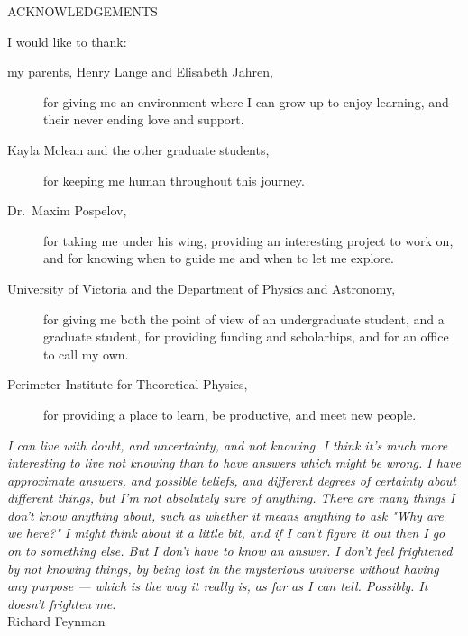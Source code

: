 \newpage
{}

\begin{center}
ACKNOWLEDGEMENTS
\end{center}

\noindent I would like to thank:
\begin{description}
\item[my parents, Henry Lange and Elisabeth Jahren,]
    for giving me an environment where I can grow up to enjoy learning, and their never ending love and support.
\item[Kayla Mclean and the other graduate students,]
    for keeping me human throughout this journey.
\item[Dr.~Maxim Pospelov,]
    for taking me under his wing, providing an interesting project to work on, and for knowing when to guide me and when to let me explore.
\item[University of Victoria and the Department of Physics and Astronomy,]
    for giving me both the point of view of an undergraduate student, and a graduate student, for providing funding and scholarhips, and for an office to call my own.
\item[Perimeter Institute for Theoretical Physics,]
    for providing a place to learn, be productive, and meet new people.
\end{description}

\begin{flushright}
\textit{I can live with doubt, and uncertainty, and not
knowing. I think it's much more interesting to live not
knowing than to have answers which might be wrong.
I have approximate answers, and possible beliefs,
and different degrees of certainty about different things,
but I'm not absolutely sure of anything.
There are many things I don't know anything about,
such as whether it means anything to ask "Why are we here?"
I might think about it a little bit, and if I can't
figure it out then I go on to something else.
But I don't have to know an answer.
I don't feel frightened by not knowing things,
by being lost in the mysterious universe without having any purpose —
which is the way it really is, as far as I can tell.
Possibly. It doesn't frighten me.}
\\
Richard Feynman\\
\end{flushright}
